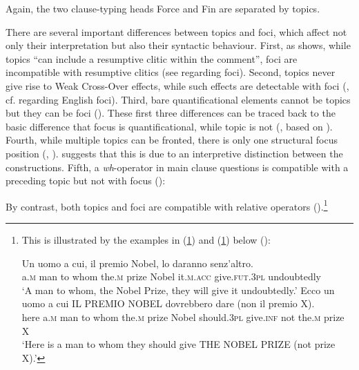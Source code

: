 Again, the two clause-typing heads Force and Fin are separated by topics.

There are several important differences between topics and foci, which affect not only their interpretation but also their syntactic behaviour. First, as \citet[289--290]{rizzi1997} shows, while topics ``can include a resumptive clitic within the comment'', foci are incompatible with resumptive clitics (see \citealt{cinque1990} regarding foci). Second, topics never give rise to Weak Cross-Over effects, while such effects are detectable with foci (\citealt[290]{rizzi1997}, cf. \citealt{culicover1992} regarding English foci). Third, bare quantificational elements cannot be topics but they can be foci (\citealt[290]{rizzi1997}). These first three differences can be traced back to the basic difference that focus is quantificational, while topic is not (\citealt[291--295]{rizzi1997}, based on \citealt{cinque1990}). Fourth, while multiple topics can be fronted, there is only one structural focus position (\citealt[290--291]{rizzi1997}, \citealt{beninca1988}). \citet[295--300]{rizzi1997} suggests that this is due to an interpretive distinction between the constructions. Fifth, a \textit{wh}-operator in main clause questions is compatible with a preceding topic but not with focus (\citealt[291, ex. 24a and 25a]{rizzi1997}):

\ea \label{gianni}
\z
\z

By contrast, both topics and foci are compatible with relative operators (\citealt[291]{rizzi1997}).\footnote{This is illustrated by the examples in (\ref{topicrel}) and (\ref{focusrel}) below (\citealt[289 and 298, ex. 12a and 44a]{rizzi1997}):

\ea \gll Un uomo a cui, il premio Nobel, lo daranno senz'altro. \label{topicrel}\\
a.\textsc{m} man to whom the.\textsc{m} prize Nobel it.\textsc{m.acc} give.\textsc{fut.3pl} undoubtedly\\
\glt `A man to whom, the Nobel Prize, they will give it undoubtedly.'
\ex \gll Ecco un uomo a cui IL PREMIO NOBEL dovrebbero dare (non il premio X). \label{focusrel}\\
here a.\textsc{m} man to whom the.\textsc{m} prize Nobel should.\textsc{3pl} give.\textsc{inf} \phantom{(}not the.\textsc{m} prize X\\
\glt `Here is a man to whom they should give THE NOBEL PRIZE (not prize X).'
\z
}

